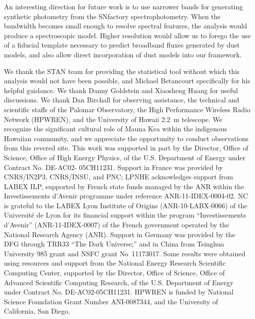 \documentclass{aastex61}   	%
\begin{document}
An interesting direction for future work is to use narrower bands for generating synthetic photometry
from the SNfactory spectrophotometry.  When the bandwidth becomes small enough
to resolve spectral features, the analysis would produce a spectroscopic model.   Higher resolution would allow us to forego 
the use of a fiducial template necessary to predict broadband fluxes generated by dust models, and also allow direct incorporation
of dust models into our framework.

\acknowledgments
We thank the STAN team for providing the statistical tool without which this analysis would not have been possible,
and Michael Betancourt specifically for his helpful guidance.  We thank Danny Goldstein and
Xiaosheng Huang for useful discussions.
We thank Dan Birchall for observing assistance, the technical and
scientific staffs of the Palomar Observatory, the High Performance
Wireless Radio Network (HPWREN), and the University of Hawaii 2.2~m
telescope.  We recognize the significant cultural role of Mauna Kea
within the indigenous Hawaiian community, and we appreciate the
opportunity to conduct observations from this revered site.  This
work was supported in part by the Director, Office of Science,
Office of High Energy Physics, of the U.S. Department of Energy
under Contract No. DE-AC02- 05CH11231.  Support in France was
provided by CNRS/IN2P3, CNRS/INSU, and PNC; LPNHE acknowledges
support from LABEX ILP, supported by French state funds managed by
the ANR within the Investissements d'Avenir programme under reference
ANR-11-IDEX-0004-02.  NC is grateful to the LABEX Lyon Institute
of Origins (ANR-10-LABX-0066) of the Universit\'e de Lyon for its
financial support within the program ``Investissements d'Avenir''
(ANR-11-IDEX-0007) of the French government operated by the National
Research Agency (ANR).  Support in Germany was provided by the DFG
through TRR33 ``The Dark Universe;'' and in China from Tsinghua
University 985 grant and NSFC grant No~11173017.  Some results were
obtained using resources and support from the National Energy
Research Scientific Computing Center, supported by the Director,
Office of Science, Office of Advanced Scientific Computing Research,
of the U.S. Department of Energy under Contract No. DE-AC02-05CH11231.
HPWREN is funded by National Science Foundation Grant Number
ANI-0087344, and the University of California, San Diego.




\end{document}

